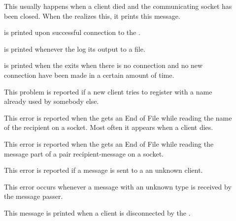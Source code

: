 \begin{description}

\item[]
This usually happens when a client died and the communicating socket
has been closed. When the \MPA{} realizes this, it prints this message.

\item[] is printed upon
    successful connection to the \MPA{}.

\item[] is printed whenever the \MPA{} log
    its output to a file.

\item[]
    is printed when the \MPA{} exits when there is no connection  and no new
    connection have been made in a certain amount of time.

\item[]
This problem is reported if a new client tries to register
with a name already used by somebody else.

\item[]
This error is reported when the \MPA{} gets an End of File while
reading the name of the recipient on a socket. Most often it appears
when a client dies.

\item[]
This error is reported when the \MPA{} gets an End of File while
reading the message part of a pair recipient-message on a socket.

\item[]
This error is reported if a message is sent to a an unknown client.

\item[] This
    error occurs whenever a message with an unknown type is received by the
    message passer.

\item[] This
    message is printed when a client is disconnected by the \MPA{}.


\end{description}
